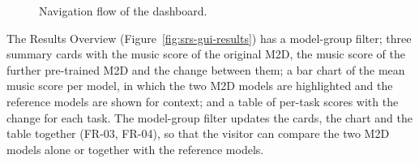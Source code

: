 \documentclass{FastFyp}
\begin{document}
\begin{figure}[htbp]
\centering
\singlespacing
{}
\caption[Navigation flow of the dashboard]{Navigation flow of the dashboard.}
\label{fig:srs-nav}
\end{figure}

The Results Overview (Figure~\ref{fig:srs-gui-results}) has a model-group filter; three summary cards with the music score of the original M2D, the music score of the further pre-trained M2D and the change between them; a bar chart of the mean music score per model, in which the two M2D models are highlighted and the reference models are shown for context; and a table of per-task scores with the change for each task. The model-group filter updates the cards, the chart and the table together (FR-03, FR-04), so that the visitor can compare the two M2D models alone or together with the reference models.
\end{document}
